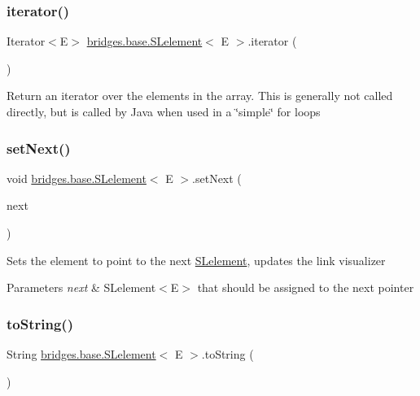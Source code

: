 \subsubsection{\texorpdfstring{iterator()}{iterator()}}
{\footnotesize\ttfamily Iterator$<$E$>$ \hyperlink{classbridges_1_1base_1_1_s_lelement}{bridges.\+base.\+S\+Lelement}$<$ E $>$.iterator (\begin{DoxyParamCaption}{ }\end{DoxyParamCaption})}

Return an iterator over the elements in the array. This is generally not called directly, but is called by Java when used in a \char`\"{}simple\char`\"{} for loops \mbox{\label{classbridges_1_1base_1_1_s_lelement_afdd42f03071b2614822b73729e1a5a1a}} 
\subsubsection{\texorpdfstring{set\+Next()}{setNext()}}
{\footnotesize\ttfamily void \hyperlink{classbridges_1_1base_1_1_s_lelement}{bridges.\+base.\+S\+Lelement}$<$ E $>$.set\+Next (\begin{DoxyParamCaption}\item[{\hyperlink{classbridges_1_1base_1_1_s_lelement}{S\+Lelement}$<$ E $>$}]{next }\end{DoxyParamCaption})}

Sets the element to point to the next \hyperlink{classbridges_1_1base_1_1_s_lelement}{S\+Lelement}, updates the link visualizer


\begin{DoxyParams}{Parameters}
{\em next} & S\+Lelement$<$\+E$>$ that should be assigned to the next pointer \\
\hline
\end{DoxyParams}
\mbox{\label{classbridges_1_1base_1_1_s_lelement_af0ec4da5b29d0f5ab6ab38e91cca51f9}} 
\subsubsection{\texorpdfstring{to\+String()}{toString()}}
{\footnotesize\ttfamily String \hyperlink{classbridges_1_1base_1_1_s_lelement}{bridges.\+base.\+S\+Lelement}$<$ E $>$.to\+String (\begin{DoxyParamCaption}{ }\end{DoxyParamCaption})}



